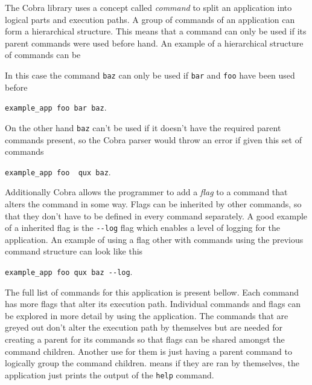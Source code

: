 The Cobra library uses a concept called \textit{command} to split an application into logical parts and execution paths. A group of commands of an application can form a hierarchical structure. This means that a command can only be used if its parent commands were used before hand. An example of a hierarchical structure of commands can be

\vspace{0.5em}
\vspace{0.5em}

\noindent In this case the command \texttt{baz} can only be used if \texttt{bar} and \texttt{foo} have been used before
\begin{center}
  \texttt{example\_app foo bar baz}.
\end{center}
On the other hand \texttt{baz} can't be used if it doesn't have the required parent commands present, so the Cobra parser would throw an error if given this set of commands
\begin{center}
  \texttt{example\_app foo {\color{red} qux} baz}.
\end{center}
Additionally Cobra allows the programmer to add a \textit{flag} to a command that alters the command in some way. Flags can be inherited by other commands, so that they don't have to be defined in every command separately. A good example of a inherited flag is the \texttt{-\--log} flag which enables a level of logging for the application. An example of using a flag other with commands using the previous command structure can look like this
\begin{center}
  \texttt{example\_app foo qux baz -\--log}.
\end{center}

The full list of commands for this application is present bellow. Each command has more flags that alter its execution path. Individual commands and flags can be explored in more detail by using the application. The commands that are greyed out don't alter the execution path by themselves but are needed for creating a parent for its commands so that flags can be shared amongst the command children. Another use for them is just having a parent command to logically group the command children. means if they are ran by themselves, the application just prints the output of the \texttt{help} command.

\vspace{0.5em}



